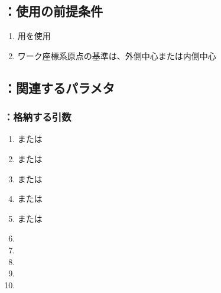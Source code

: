 \subsection{\KCurvedOutcutRLeft：使用の前提条件}
\begin{enumerate}[label*=\sarrow]
\item \OutcutMilling 用\SquareEndMill を使用
\item {}ワーク座標系原点の基準は、外側中心または内側中心
\end{enumerate}


\subsection{\KCurvedOutcutRLeft：関連するパラメタ}

\subsubsection{\KCurvedOutcutRLeft：格納する引数}
\begin{enumerate}[label*=\sarrow]
\item \PMTopOutcutACWidth または\PMBottomOutcutACWidth
\item \PMTopOutcutBDWidth または\PMBottomOutcutBDWidth
\item \PMTopOutcutCornerR または\PMBottomOutcutCornerR
\item \PMTopOutcutLength または\PMBottomOutcutLength
\item \PMTopReAlocationLength または\PMBottomReAlocationLength
\item \PMACOD
\item \PMBDOD
\item \PMCenterCurvatureRadius
\item \PMKeywayPos
\item \PMKeywayWidth
\end{enumerate}

\clearpage
